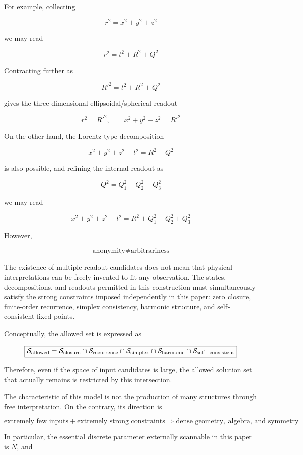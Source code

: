 \documentclass[
  a4paper,
]{article}
\begin{document}
For example, collecting

\[
r^2=x^2+y^2+z^2
\]

we may read

\[
r^2=t^2+R^2+Q^2
\]

Contracting further as

\[
R'^2=t^2+R^2+Q^2
\]

gives the three-dimensional ellipsoidal/spherical readout

\[
r^2=R'^2,
\qquad
x^2+y^2+z^2=R'^2
\]

On the other hand, the Lorentz-type decomposition

\[
x^2+y^2+z^2-t^2=R^2+Q^2
\]

is also possible, and refining the internal readout as

\[
Q^2=Q_1^2+Q_2^2+Q_3^2
\]

we may read

\[
x^2+y^2+z^2-t^2
=
R^2+Q_1^2+Q_2^2+Q_3^2
\]

However,

\[
\boxed{\text{anonymity}\neq\text{arbitrariness}}
\]

The existence of multiple readout candidates does not mean that physical
interpretations can be freely invented to fit any observation. The
states, decompositions, and readouts permitted in this construction must
simultaneously satisfy the strong constraints imposed independently in
this paper: zero closure, finite-order recurrence, simplex consistency,
harmonic structure, and self-consistent fixed points.

Conceptually, the allowed set is expressed as

\[
\boxed{
\mathcal S_{\rm allowed}
=
\mathcal S_{\rm closure}
\cap
\mathcal S_{\rm recurrence}
\cap
\mathcal S_{\rm simplex}
\cap
\mathcal S_{\rm harmonic}
\cap
\mathcal S_{\rm self-consistent}
}
\]

Therefore, even if the space of input candidates is large, the allowed
solution set that actually remains is restricted by this intersection.

The characteristic of this model is not the production of many
structures through free interpretation. On the contrary, its direction
is

\[
\boxed{
\text{extremely few inputs}
+
\text{extremely strong constraints}
\Longrightarrow
\text{dense geometry, algebra, and symmetry}
}
\]

In particular, the essential discrete parameter externally scannable in
this paper is \(N\), and
\end{document}
